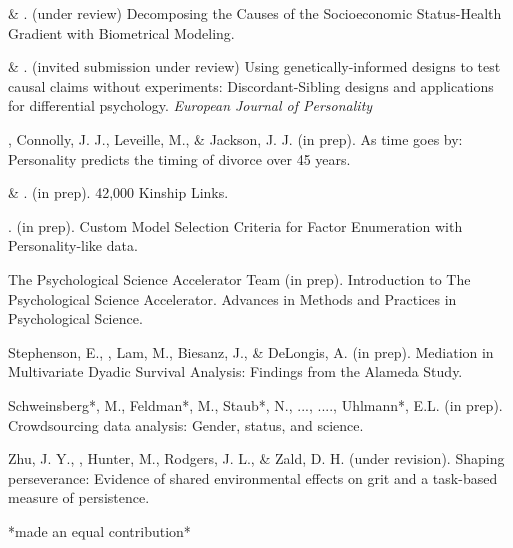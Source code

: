 
\item \meb \& \joe.  (under review) Decomposing the Causes of the Socioeconomic Status-Health Gradient with Biometrical Modeling.   \href{https://osf.io/vd2kc/}{\color{blue}{https://osf.io/vd2kc/}} %
\item \meb \& \joe. (invited submission under review) Using genetically-informed designs to test causal claims without experiments: Discordant-Sibling designs and applications for differential psychology. \textit{European Journal of Personality}  \href{https://osf.io/zpdwt/}{\color{blue}{https://osf.io/zpdwt/}}
\item\meb, Connolly, J. J., Leveille, M., \& Jackson, J. J. (in prep). As time goes by: Personality predicts the timing of divorce over 45 years.%
\item \meb \& \joe.  (in prep). 42,000 Kinship Links.
\item \meb. (in prep). Custom Model Selection Criteria for Factor Enumeration with Personality-like data.


\item The Psychological Science Accelerator Team (in prep). Introduction to The Psychological Science Accelerator. Advances in Methods and Practices in Psychological Science.
\item Stephenson, E., \meb, Lam, M., Biesanz, J., \& DeLongis, A. (in prep). Mediation in Multivariate Dyadic Survival Analysis: Findings from the Alameda Study. %
\item Schweinsberg*, M., Feldman*, M., Staub*, N., ..., \meb ...., Uhlmann*, E.L. (in prep). Crowdsourcing data analysis: Gender, status, and science. 
\item Zhu, J. Y., \meb, Hunter, M., Rodgers, J. L., \& Zald, D. H. (under revision). Shaping perseverance: Evidence of shared environmental effects on grit and a task-based measure of persistence. %
\vspace{-2mm}\begin{center}\footnotesize{*made an equal contribution*}\end{center} \vspace{-3mm}
\vspace{-2mm}\begin{center}\end{center} \vspace{-4mm}